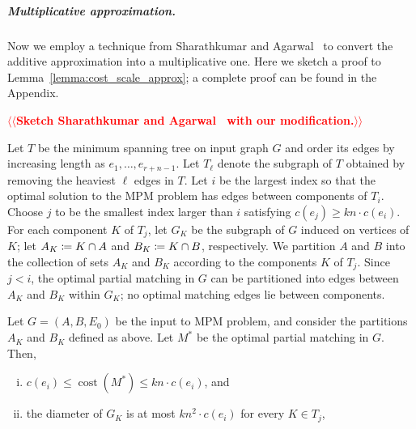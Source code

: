 \documentclass[a4paper,UKenglish]{socg-lipics-v2018}
\makeatletter
\def\note#1{\textcolor{red}{{#1}}}
\def\polylog{\mathop{\mathrm{polylog}}}
\def\cost{\operatorname{cost}}
\theoremstyle{plain}
\numberwithin{figure}{section}
\renewcommand{\paragraph}{\subparagraph}
\def\EMPH#1{\textbf{\emph{\boldmath #1}}}
\def\n@te#1{\textsf{\boldmath \textbf{$\langle\!\langle$#1$\rangle\!\rangle$}}\leavevmode}
\def\note#1{\textcolor{red}{\n@te{#1}}}
\makeatother
\begin{document}
\paragraph{Multiplicative approximation.}
Now we employ a technique from Sharathkumar and Agarwal~\cite{SA12} to convert the additive approximation into a multiplicative one.
%
Here we sketch a proof to Lemma~\ref{lemma:cost_scale_approx}; a complete proof can be found in the Appendix.

\note{Sketch Sharathkumar and Agarwal~\cite{SA12} with our modification.}

\begin{toappendix}

Let $T$ be the minimum spanning tree on input graph $G$ and order
its edges by increasing length as $e_1, \ldots, e_{r+n-1}$.
Let $T_\ell$ denote the subgraph of $T$ obtained by removing the heaviest $\ell$ edges in $T$.
%
Let $i$ be the largest index so that
the optimal solution to the MPM problem has edges between components of $T_i$.
Choose $j$ to be the smallest index larger than $i$ satisfying
$c(e_j) \geq kn \cdot c(e_i)$.
For each component $K$ of $T_j$, let
$G_K$ be the subgraph of $G$ induced on vertices of $K$;
let $\EMPH{$A_K$} \coloneqq K \cap A$ and $\EMPH{$B_K$} \coloneqq K \cap B$, respectively.
We partition $A$ and $B$ into the collection of sets $A_K$ and $B_K$ according to the components $K$ of $T_j$.
Since $j < i$, the optimal partial matching in $G$ can be partitioned into edges between $A_K$ and $B_K$ within $G_K$; no optimal matching edges lie between components.

\begin{lemma}
\label{lemma:sa_partition}
%
Let $G = (A,B,E_0)$ be the input to MPM problem, and consider the partitions $A_K$ and $B_K$ defined as above.
Let $M^*$ be the optimal partial matching in $G$.
Then,
\begin{enumerate}[(i)]
\item $c(e_i) \leq \cost(M^*) \le kn \cdot c(e_i)$, and
\item the diameter of $G_K$ is at most $kn^2 \cdot c(e_i)$ for every $K \in T_j$,
\end{enumerate}
\end{lemma}


\end{toappendix}
\end{document}
